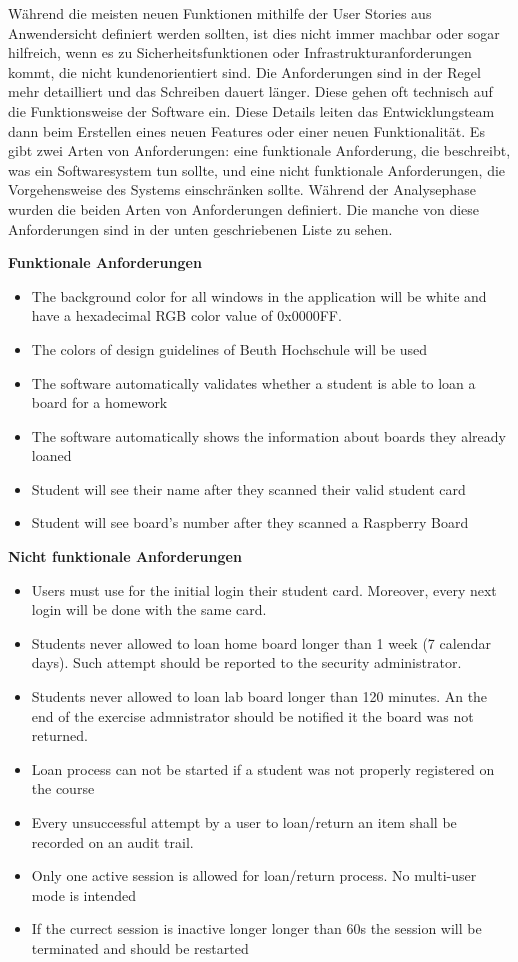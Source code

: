 Während die meisten neuen Funktionen mithilfe der User Stories aus Anwendersicht definiert werden sollten, ist dies nicht immer machbar oder sogar hilfreich, wenn es zu Sicherheitsfunktionen oder Infrastrukturanforderungen kommt, die nicht kundenorientiert sind. Die Anforderungen sind in der Regel mehr detailliert und das Schreiben dauert länger. Diese gehen oft technisch auf die Funktionsweise der Software ein. Diese Details leiten das Entwicklungsteam dann beim Erstellen eines neuen Features oder einer neuen Funktionalität. Es gibt zwei Arten von Anforderungen: eine funktionale Anforderung, die beschreibt, was ein Softwaresystem tun sollte, und eine nicht funktionale Anforderungen, die Vorgehensweise des Systems einschränken sollte. Während der Analysephase wurden die beiden Arten von Anforderungen definiert. Die manche von diese Anforderungen sind in der unten geschriebenen Liste zu sehen.

\textbf{Funktionale Anforderungen}
\begin{itemize}
	\itemsep-1.2em 
	\item The background color for all windows in the application will be white and have a hexadecimal RGB color value of 0x0000FF.
	\item The colors of design guidelines of Beuth Hochschule will be used
	\item The software automatically validates whether a student is able to loan a board for a homework
	\item The software automatically shows the information about boards they already loaned
	\item Student will see their name after they scanned their valid student card
	\item Student will see board's number after they scanned a Raspberry Board
\end{itemize}

\textbf{Nicht funktionale Anforderungen}
\begin{itemize}
	\itemsep-1.2em 
	\item Users must use for the initial login their student card. Moreover, every next login will be done with the same card. 
	\item Students never allowed to loan home board longer than 1 week (7 calendar days). Such attempt should be reported to the security administrator.
	\item Students never allowed to loan lab board longer than 120 minutes. An the end of the exercise admnistrator should be notified it the board was not returned.
	\item Loan process can not be started if a student was not properly registered on the course
	\item Every unsuccessful attempt by a user to loan/return an item shall be recorded on an audit trail.
	\item Only one active session is allowed for loan/return process. No multi-user mode is intended
	\item If the currect session is inactive longer longer than 60s the session will be terminated and should be restarted
\end{itemize}

